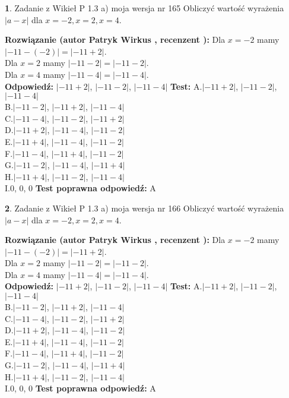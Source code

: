 \documentclass[12pt, a4paper]{article}
\theoremstyle{definition} %
\newtheorem{zad}{}
\newcommand{\zadStart}[1]{\begin{zad}#1\newline}
\newcommand{\zadStop}{\end{zad}}
\newcommand{\rozwStart}[2]{\noindent \textbf{Rozwiązanie (autor #1 , recenzent #2): }\newline}
\newcommand{\rozwStop}{\newline}
\newcommand{\odpStart}{\noindent \textbf{Odpowiedź:}\newline}
\newcommand{\odpStop}{\newline}
\newcommand{\testStart}{\noindent \textbf{Test:}\newline}
\newcommand{\testStop}{\newline}
\newcommand{\kluczStart}{\noindent \textbf{Test poprawna odpowiedź:}\newline}
\newcommand{\kluczStop}{\newline}
\begin{document}
\zadStart{Zadanie z Wikieł P 1.3 a) moja wersja nr 165}
Obliczyć wartość wyrażenia $|a - x|$ dla $x=-2,x=2,x=4$.
\zadStop
\rozwStart{Patryk Wirkus}{}
Dla $x = -2$ mamy $|-11 - (-2)| = |-11 + 2|$.\\
Dla $x = 2$ mamy $|-11 - 2| = |-11 - 2|$.\\
Dla $x = 4$ mamy $|-11 - 4| = |-11 - 4|$.\\
\rozwStop
\odpStart
$|-11 + 2|$, $|-11 - 2|$, $|-11 - 4|$
\odpStop
\testStart
A.$|-11 + 2|$, $|-11 - 2|$, $|-11 - 4|$\\
B.$|-11 - 2|$, $|-11 + 2|$, $|-11 - 4|$\\
C.$|-11 - 4|$, $|-11 - 2|$, $|-11 + 2|$\\
D.$|-11 + 2|$, $|-11 - 4|$, $|-11 - 2|$\\
E.$|-11 + 4|$, $|-11 - 4|$, $|-11 - 2|$\\
F.$|-11 - 4|$, $|-11 + 4|$, $|-11 - 2|$\\
G.$|-11 - 2|$, $|-11 - 4|$, $|-11 + 4|$\\
H.$|-11 + 4|$, $|-11 - 2|$, $|-11 - 4|$\\
I.$0$, $0$, $0$
\testStop
\kluczStart
A
\kluczStop



\zadStart{Zadanie z Wikieł P 1.3 a) moja wersja nr 166}
Obliczyć wartość wyrażenia $|a - x|$ dla $x=-2,x=2,x=4$.
\zadStop
\rozwStart{Patryk Wirkus}{}
Dla $x = -2$ mamy $|-11 - (-2)| = |-11 + 2|$.\\
Dla $x = 2$ mamy $|-11 - 2| = |-11 - 2|$.\\
Dla $x = 4$ mamy $|-11 - 4| = |-11 - 4|$.\\
\rozwStop
\odpStart
$|-11 + 2|$, $|-11 - 2|$, $|-11 - 4|$
\odpStop
\testStart
A.$|-11 + 2|$, $|-11 - 2|$, $|-11 - 4|$\\
B.$|-11 - 2|$, $|-11 + 2|$, $|-11 - 4|$\\
C.$|-11 - 4|$, $|-11 - 2|$, $|-11 + 2|$\\
D.$|-11 + 2|$, $|-11 - 4|$, $|-11 - 2|$\\
E.$|-11 + 4|$, $|-11 - 4|$, $|-11 - 2|$\\
F.$|-11 - 4|$, $|-11 + 4|$, $|-11 - 2|$\\
G.$|-11 - 2|$, $|-11 - 4|$, $|-11 + 4|$\\
H.$|-11 + 4|$, $|-11 - 2|$, $|-11 - 4|$\\
I.$0$, $0$, $0$
\testStop
\kluczStart
A
\kluczStop
\end{document}
